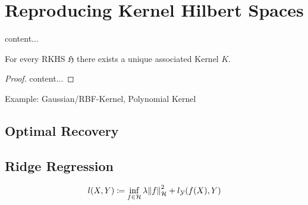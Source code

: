\section{Reproducing Kernel Hilbert Spaces}

\begin{definition}[RKHS]
	content...
\end{definition}

\begin{theorem}
	\label{theo:kernel-for-rkhs}
	For every RKHS $\mathfrak{H}$ there exists a unique associated Kernel $K$.
\end{theorem}
\begin{proof}
	content...
\end{proof}

Example: Gaussian/RBF-Kernel, Polynomial Kernel
\subsection{Optimal Recovery}

\begin{theorem}
	\label{theo:representer}
\end{theorem}

\subsection{Ridge Regression}

\begin{equation}
	\label{eq:ridge-regression-loss}
	l(X, Y) \coloneqq \inf_{f \in \mathcal{H}} \lambda \norm{f}_\mathcal{H}^2 
	+ l_{\mathcal{Y}} (f(X), Y)
\end{equation}
